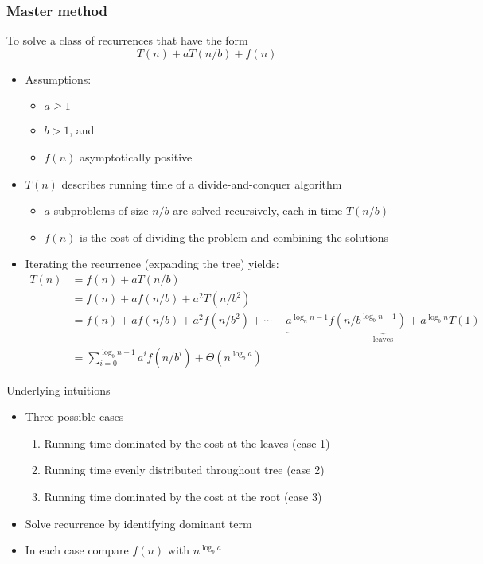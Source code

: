 \subsubsection{Master method}
To solve a class of recurrences that have the form \[
T(n) + a T(n/b)+f(n)
\]
\begin{itemize}
    \item Assumptions: 
    \begin{itemize}
        \item $a\geq 1$
        \item $b>1$, and
        \item $f(n)$ asymptotically positive
    \end{itemize}
    \item $T(n)$ describes running time of a divide-and-conquer algorithm 
    \begin{itemize}
        \item $a$ subproblems of size $n/b$ are solved recursively, each in time $T(n/b)$
        \item $f(n)$ is the cost of dividing the problem and combining the solutions
    \end{itemize}
    \item Iterating the recurrence (expanding the tree) yields: 
    \begin{align*}
        T(n) &= f(n) + a T(n/b) \\
        &= f(n) + af(n/b) + a^2T(n/b^2) \\
        &=f(n) + af(n/b) + a^2f(n/b^2) + \cdots + \underbrace{a^{\log_n n-1}f(n/b^{\log_b n-1}) + a^{\log_b n }T(1)}_\text{leaves} \\
        &= \sum_{i=0}^{\log_b n-1} a^i f(n/b^i) + \Theta(n^{\log_b a})
    \end{align*}
\end{itemize}

Underlying intuitions
\begin{itemize}
    \item Three possible cases
    \begin{enumerate}
        \item Running time dominated by the cost at the leaves (case 1)
        \item Running time evenly distributed throughout tree (case 2)
        \item Running time dominated by the cost at the root (case 3)
    \end{enumerate}
    \item Solve recurrence by identifying dominant term
    \item In each case compare $f(n)$ with $n^{\log_b a}$
\end{itemize}


